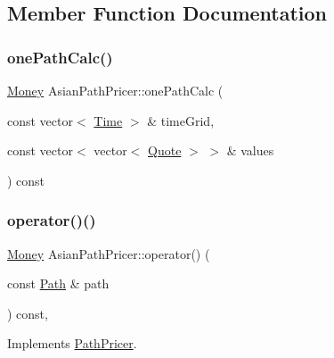 \subsection{Member Function Documentation}
\hypertarget{class_asian_path_pricer_a33d53acde0a8553f4adcee70c47f50b4}{}\label{class_asian_path_pricer_a33d53acde0a8553f4adcee70c47f50b4} 
\subsubsection{\texorpdfstring{one\+Path\+Calc()}{onePathCalc()}}
{\footnotesize\ttfamily \hyperlink{_name_def_8h_a5a9d48c16a694e9a2d9f1eca730dc8c5}{Money} Asian\+Path\+Pricer\+::one\+Path\+Calc (\begin{DoxyParamCaption}\item[{const vector$<$ \hyperlink{_name_def_8h_ac2d3e0ba793497bcca555c7c2cf64ff3}{Time} $>$ \&}]{time\+Grid,  }\item[{const vector$<$ vector$<$ \hyperlink{_name_def_8h_a642a6c5fd87319d922637de0e0bb0305}{Quote} $>$ $>$ \&}]{values }\end{DoxyParamCaption}) const\hspace{0.3cm}{\ttfamily [private]}}

\hypertarget{class_asian_path_pricer_adb10ce912ab34560d762ce0523ae394e}{}\label{class_asian_path_pricer_adb10ce912ab34560d762ce0523ae394e} 
\subsubsection{\texorpdfstring{operator()()}{operator()()}}
{\footnotesize\ttfamily \hyperlink{_name_def_8h_a5a9d48c16a694e9a2d9f1eca730dc8c5}{Money} Asian\+Path\+Pricer\+::operator() (\begin{DoxyParamCaption}\item[{const \hyperlink{class_path}{Path} \&}]{path }\end{DoxyParamCaption}) const\hspace{0.3cm}{\ttfamily [override]}, {\ttfamily [virtual]}}



Implements \hyperlink{class_path_pricer_a057bf6a83f0cc2be06154144192ed918}{Path\+Pricer}.



